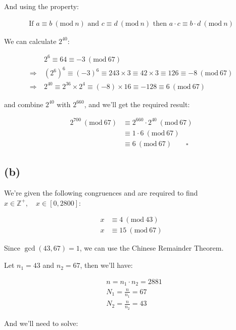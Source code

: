 \documentclass{article}
\newcommand{\modwos}[1]{\ (\mathrm{mod}\ #1)}
\begin{document}
And using the property:

\begin{align*}
    \text{If } a \equiv b \modwos{n} \text{ and } c \equiv d \modwos{n} \text{ then } a \cdot c \equiv b \cdot d \modwos{n}
\end{align*}

We can calculate $2^{40}$:

\begin{align*}
    &2^6 \equiv 64 \equiv -3 \modwos{67} \\
    \Rightarrow \ & (2^6)^6 \equiv (-3)^6 \equiv 243 \times 3 \equiv 42 \times 3 \equiv 126 \equiv -8 \modwos{67} \\
    \Rightarrow \ & 2^{40} \equiv 2^{36} \times 2^4 \equiv (-8) \times 16 \equiv -128 \equiv 6 \modwos{67}
\end{align*}


and combine $2^{40}$ with $2^{660}$, and we'll get the required result:

\begin{align*}
    2^{700} \modwos{67}
    &\equiv 2^{660} \cdot 2^{40} \modwos{67} \\
    &\equiv 1 \cdot 6 \modwos{67} \\
    &\equiv 6 \modwos{67} \qquad \square
\end{align*}

\subsection*{(b)}

We're given the following congruences and are required to find $x \in \mathbb{Z}^+, \quad x \in [0, 2800]$:

\begin{align*}
    x &\equiv 4 \modwos{43} \\
    x &\equiv 15 \modwos{67} 
\end{align*}

Since $\gcd (43, 67) = 1$, we can use the Chinese Remainder Theorem.
\bigskip

Let $n_1 = 43$ and $n_2 = 67$, then we'll have:

\begin{align*}
    &n = n_1 \cdot n_2 = 2881 \\
    &N_1 = \frac{n}{n_1} = 67 \\
    &N_2 = \frac{n}{n_2} = 43 
\end{align*}

And we'll need to solve:
\end{document}
